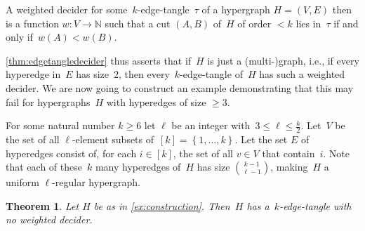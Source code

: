 \documentclass[11pt]{article}
\newtheorem{THM}{Theorem}
\theoremstyle{definition}
\newcommand{\N}{\mathbb{N}}
\newcommand{\menge}[1]{\left\{#1\right\}}
\begin{document}
A weighted decider for some~$ k $-edge-tangle~$ \tau $ of a hypergraph $ H=(V,E) $ then is a function $ w\colon V\to\N $ such that a cut $ (A,B) $ of~$ H $ of order $ <k $ lies in~$ \tau $ if and only if~$ w(A)<w(B) $.

\cref{thm:edgetangledecider} thus asserts that if~$ H $ is just a (multi-)graph, i.e., if every hyperedge in~$ E $ has size~$ 2 $, then every~$ k $-edge-tangle of~$ H $ has such a weighted decider. We are now going to construct an example demonstrating that this may fail for hypergraphs~$ H $ with hyperedges of size $\ge 3$.

\begin{EX}\label{ex:construction}
	For some natural number $ k\ge 6 $ let $ \ell $ be an integer with~$ 3\le \ell\le\frac{k}{2} $. Let~$ V $ be the set of all $ \ell $-element subsets of~$ [k]=\menge{1,\dots,k} $. Let the set $ E $ of hyperedges consist of, for each $ i\in[k] $, the set of all $ v\in V $ that contain~$ i $.
%	
	Note that each of these~$ k $ many hyperedges of~$ H $ has size $ \binom{k-1}{\ell-1} $, making~$ H $ a uniform $ \ell $-regular hypergraph.
\end{EX}


\begin{THM}\label{thm:edgeexampel}
	Let $H$ be as in \cref{ex:construction}. Then~$ H $ has a~$ k $-edge-tangle with no weighted decider.
\end{THM}
\end{document}
